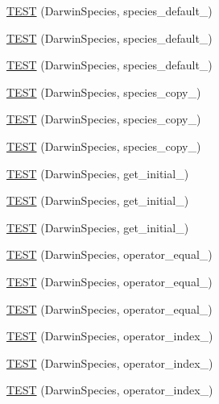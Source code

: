 \begin{DoxyCompactItemize}
\item 
\hyperlink{TestDarwin_8c_09_09_abb952ba278a89caab2854dca8da4cf02}{T\-E\-S\-T} (Darwin\-Species, species\-\_\-default\-\_)
\item 
\hyperlink{TestDarwin_8c_09_09_a65589c9ffcdecb8d75c2bd53792b5448}{T\-E\-S\-T} (Darwin\-Species, species\-\_\-default\-\_)
\item 
\hyperlink{TestDarwin_8c_09_09_a66ca0f0a78d9b7465e9e442313bad286}{T\-E\-S\-T} (Darwin\-Species, species\-\_\-default\-\_)
\item 
\hyperlink{TestDarwin_8c_09_09_a9fcb9b37140e3b1f16993e63e5f40987}{T\-E\-S\-T} (Darwin\-Species, species\-\_\-copy\-\_)
\item 
\hyperlink{TestDarwin_8c_09_09_a814b2ced774b02f2c4b716aaff04df28}{T\-E\-S\-T} (Darwin\-Species, species\-\_\-copy\-\_)
\item 
\hyperlink{TestDarwin_8c_09_09_a950f40e90009102f8f1c9ac91cb9b6af}{T\-E\-S\-T} (Darwin\-Species, species\-\_\-copy\-\_)
\item 
\hyperlink{TestDarwin_8c_09_09_a32bdcccce90db25fdb87435fbe32bb68}{T\-E\-S\-T} (Darwin\-Species, get\-\_\-initial\-\_)
\item 
\hyperlink{TestDarwin_8c_09_09_a54c432d828a3907104e4710c79a4e5fe}{T\-E\-S\-T} (Darwin\-Species, get\-\_\-initial\-\_)
\item 
\hyperlink{TestDarwin_8c_09_09_a5d80d76dea1721aa7152b8e19d65232f}{T\-E\-S\-T} (Darwin\-Species, get\-\_\-initial\-\_)
\item 
\hyperlink{TestDarwin_8c_09_09_a572be6972d178655e7d5a0dbf2a5d141}{T\-E\-S\-T} (Darwin\-Species, operator\-\_\-equal\-\_)
\item 
\hyperlink{TestDarwin_8c_09_09_ab7a9f34a27fd9d819a915f9785972d4e}{T\-E\-S\-T} (Darwin\-Species, operator\-\_\-equal\-\_)
\item 
\hyperlink{TestDarwin_8c_09_09_ae1a963d4219d79179ffae06c32afd70a}{T\-E\-S\-T} (Darwin\-Species, operator\-\_\-equal\-\_)
\item 
\hyperlink{TestDarwin_8c_09_09_a2afb501083415d6a659e3179ec8e1c0d}{T\-E\-S\-T} (Darwin\-Species, operator\-\_\-index\-\_)
\item 
\hyperlink{TestDarwin_8c_09_09_ad728d1d3d9e9e9cd079e99d96e928441}{T\-E\-S\-T} (Darwin\-Species, operator\-\_\-index\-\_)
\item 
\hyperlink{TestDarwin_8c_09_09_a998ef4556890240d5d5e5b13cc6661a0}{T\-E\-S\-T} (Darwin\-Species, operator\-\_\-index\-\_)

\end{DoxyCompactItemize}
